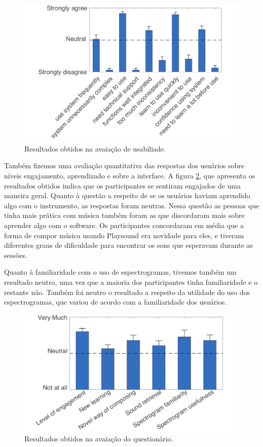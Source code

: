 \begin{figure}

\includegraphics[width=1\textwidth]{pictures/cap4/SUS_lower}
\caption{Resultados obtidos na avaiação de usabiliade.}
\label{fig:SUS}
\end{figure}

Também fizemos uma avaliação quantitativa das respostas dos usuários sobre níveis engajamento, aprendizado e sobre a interface. A figura \ref{fig:questionnaire}, que apresenta os resultados obtidos indica que os participantes se sentiram engajados de uma maneira geral. Quanto à questão a respeito de se os usuários haviam aprendido algo com o instrumento, as respostas foram neutras. Nessa questão as pessoas que tinha mais prática com música também foram as que discordaram mais sobre aprender algo com o software. Os participantes concordaram em média que a forma de compor música usando Playsound era novidade para eles, e tiveram diferentes graus de dificuldade para encontrar os sons que esperavam durante as sessões. 

Quanto à familiaridade com o uso de espectrogramas, tivemos também um resultado neutro, uma vez que a maioria dos participantes tinha familiaridade e o restante não. Também foi neutro o resultado a respeito da utilidade do uso dos espectrogramas, que variou de acordo com a familiaridade dos usuários.


\begin{figure}

\includegraphics[width=1\textwidth]{pictures/cap4/questionnaire_lower}
\caption{\label{amas}Resultados obtidos na avaiação do questionário.}
\label{fig:questionnaire}
\end{figure}

